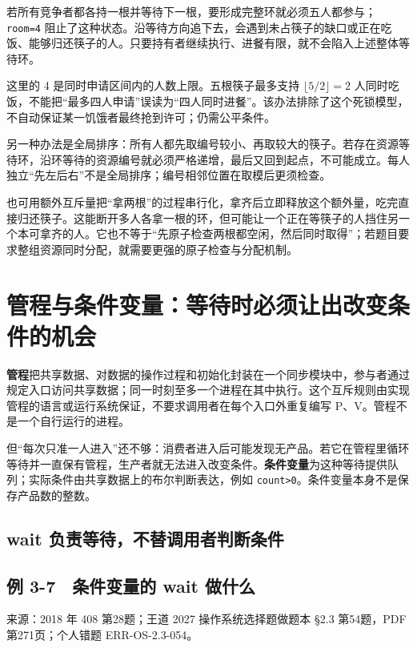 若所有竞争者都各持一根并等待下一根，要形成完整环就必须五人都参与；\texttt{room=4} 阻止了这种状态。沿等待方向追下去，会遇到未占筷子的缺口或正在吃饭、能够归还筷子的人。只要持有者继续执行、进餐有限，就不会陷入上述整体等待环。

这里的 4 是同时申请区间内的人数上限。五根筷子最多支持 \(\lfloor5/2\rfloor=2\) 人同时吃饭，不能把``最多四人申请''误读为``四人同时进餐''。该办法排除了这个死锁模型，不自动保证某一饥饿者最终抢到许可；仍需公平条件。

另一种办法是全局排序：所有人都先取编号较小、再取较大的筷子。若存在资源等待环，沿环等待的资源编号就必须严格递增，最后又回到起点，不可能成立。每人独立``先左后右''不是全局排序；编号相邻位置在取模后更须检查。

也可用额外互斥量把``拿两根''的过程串行化，拿齐后立即释放这个额外量，吃完直接归还筷子。这能断开多人各拿一根的环，但可能让一个正在等筷子的人挡住另一个本可拿齐的人。它也不等于``先原子检查两根都空闲，然后同时取得''；若题目要求整组资源同时分配，就需要更强的原子检查与分配机制。

\section{管程与条件变量：等待时必须让出改变条件的机会}\label{sec-monitor}

\textbf{管程}把共享数据、对数据的操作过程和初始化封装在一个同步模块中，参与者通过规定入口访问共享数据；同一时刻至多一个进程在其中执行。这个互斥规则由实现管程的语言或运行系统保证，不要求调用者在每个入口外重复编写 P、V。管程不是一个自行运行的进程。

但``每次只准一人进入''还不够：消费者进入后可能发现无产品。若它在管程里循环等待并一直保有管程，生产者就无法进入改变条件。\textbf{条件变量}为这种等待提供队列；实际条件由共享数据上的布尔判断表达，例如 \texttt{count\textgreater{}0}。条件变量本身不是保存产品数的整数。

\subsection{wait 负责等待，不替调用者判断条件}\label{wait-ux8d1fux8d23ux7b49ux5f85ux4e0dux66ffux8c03ux7528ux8005ux5224ux65adux6761ux4ef6}

\subsection{例 3-7　条件变量的 wait 做什么}\label{ex-2018}

来源：2018 年 408 第28题；王道 2027 操作系统选择题做题本 §2.3 第54题，PDF第271页；个人错题 ERR-OS-2.3-054。

